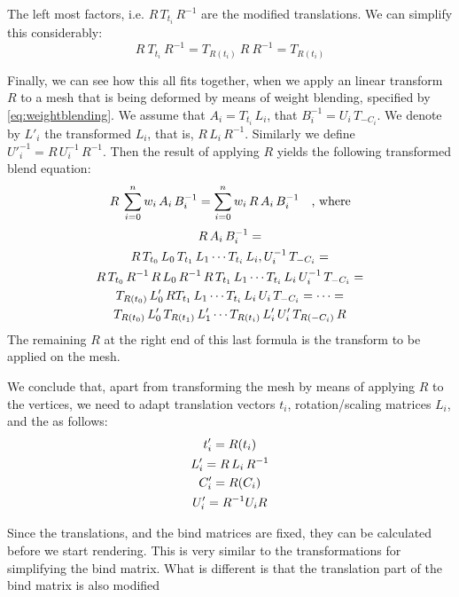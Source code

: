 \noindent
The left most factors, i.e. $R\,T_{t_i}\,R^{-1}$ are the modified translations.
We can simplify this considerably:
\begin{equation}\label{eq:transormedtranslation}
R\:T_{t_i}\:R^{-1}
=T_{R(t_i)}\:R\:R^{-1}
=T_{R(t_i)}
\end{equation}

\noindent
Finally, we can see how this all fits together, when we apply an linear transform $R$ to
a mesh that is being deformed by means of weight blending, specified by \autoref{eq:weightblending}.
We assume that  $A_i = T_{t_i}\,L_i$, that $B_i^{-1} = U_i\,T_{-C_i}$.
We denote by $L'_i$ the transformed $L_i$, that is, $R\,L_i\,R^{-1}$.
 Similarly  we define ${U'}_i^{-1} = R\,U_i^{-1}\,R^{-1}$.
Then the result of applying $R$ yields the following transformed blend equation:
%
\begin{equation}
 R \:\sum_{i=0}^{n} w_i\, A_i\,B_i^{-1} = \sum_{i=0}^{n} w_i\, R\,A_i\,B_i^{-1} \quad\text{, where}\notag
 \end{equation}
 \begin{gather}
 R\,A_i\,B_i^{-1} = \notag\\
 R\,T_{t_0}\,L_0\,T_{t_1}\,L_1\cdots T_{t_i}\,L_i,U_i^{-1}\,T_{-C_i}=\notag\\
 R\,T_{t_0}\,R^{-1}\,R\,L_0\,R^{-1}\,R\,T_{t_1}\,L_1\cdots T_{t_i}\,L_i\,U_i^{-1}\,T_{-C_i} =\notag\\
 T_{R(t_0)}\,L'_0\, R T_{t_1}\,L_1\cdots T_{t_i}\,L_i\,U_i\,T_{-C_i} =\cdots=\notag\\
 T_{R(t_0)}\,L'_0\,T_{R(t_1)}\,L'_1\cdots T_{R(t_i)}\,L'_i\,U'_i\,T_{R(-C_i)}\,R\notag
 \end{gather}
 The remaining $R$ at the right end of this last formula is the transform to be applied on the mesh.

 We conclude that, apart from transforming the mesh by means of applying $R$ to the vertices,
 we need to adapt translation vectors $t_i$, rotation/scaling matrices $L_i$,
 and the  as follows:
\begin{gather}
t_i'= R(t_i)\notag\\
L_i' = R\,L_i\,R^{-1}\notag\\
C_i' = R(C_i)\notag\\
U_i' = R^{-1} U_i R
\end{gather}

 Since the translations, and the bind matrices are fixed, they can be calculated before we start rendering.
 This is very similar to the transformations for simplifying the bind matrix.
 What is different is that the translation part of the bind matrix is also modified



